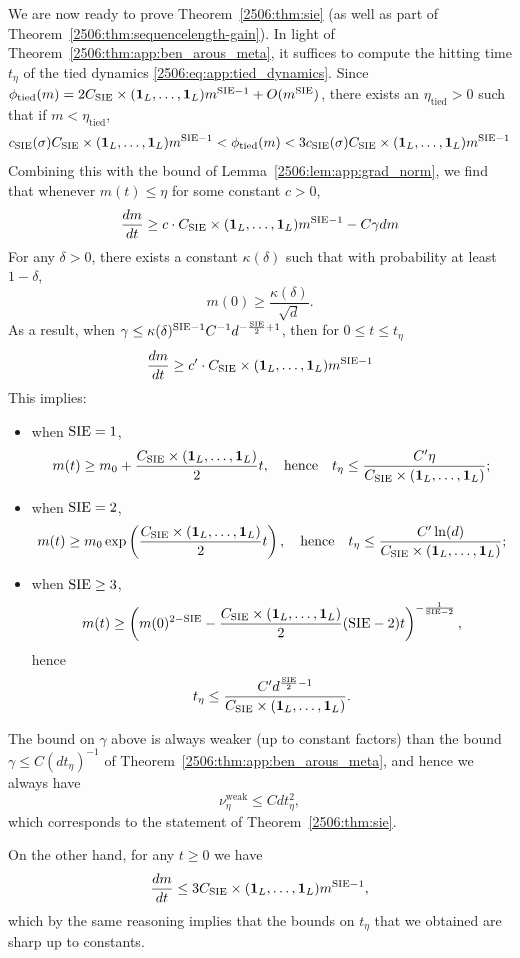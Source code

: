 We are now ready to prove Theorem~\ref{2506:thm:sie} (as well as part of Theorem~\ref{2506:thm:sequencelength-gain}). In light of Theorem~\ref{2506:thm:app:ben_arous_meta}, it suffices to compute the hitting time $t_\eta$ of the tied dynamics \eqref{2506:eq:app:tied_dynamics}.
Since $\phi_{\text{tied}}(m) = 2 C_{\mathrm{SIE}} \times (\mathbf{1}_L, \dots, \mathbf{1}_L) m^{\mathrm{SIE}-1} + O(m^{\mathrm{SIE}})$, there exists an $\eta_{\text{tied}} > 0$ such that if $m < \eta_{\text{tied}}$,
\[ c_{\mathrm{SIE}}(\sigma) C_{\mathrm{SIE}} \times (\mathbf{1}_L, \dots, \mathbf{1}_L) m^{\mathrm{SIE}-1} < \phi_{\text{tied}}(m) < 3c_{\mathrm{SIE}}(\sigma) C_{\mathrm{SIE}} \times (\mathbf{1}_L, \dots, \mathbf{1}_L) m^{\mathrm{SIE}-1} \]
Combining this with the bound of Lemma~\ref{2506:lem:app:grad_norm}, we find that whenever $m(t) \leq \eta$ for some constant $c > 0$,
\[ \frac{dm}{dt} \geq c \cdot C_{\mathrm{SIE}} \times (\mathbf{1}_L, \dots, \mathbf{1}_L) m^{\mathrm{SIE}-1} - C\gamma dm \]
For any $\delta > 0$, there exists a constant $\kappa(\delta)$ such that with  probability at least $1 - \delta$,
\[ m(0) \geq \frac{\kappa(\delta)}{\sqrt{d}}. \]
As a result, when $\gamma \leq \kappa(\delta)^{\mathrm{SIE}-1} C^{-1}d^{-\frac{\mathrm{SIE}}{2}+1}$, then for $0 \leq t \leq t_\eta$
\[ \frac{dm}{dt} \geq c' \cdot C_{\mathrm{SIE}} \times (\mathbf{1}_L, \dots, \mathbf{1}_L) m^{\mathrm{SIE}-1} \]
This implies:
\begin{itemize}
    \item when $\mathrm{SIE} = 1$,
    \[ m(t) \geq m_0 + \frac{C_{\mathrm{SIE}} \times (\mathbf{1}_L, \dots, \mathbf{1}_L)}{2}t, \quad \text{hence} \quad t_\eta \leq \frac{C'\eta}{C_{\mathrm{SIE}} \times (\mathbf{1}_L, \dots, \mathbf{1}_L)}; \]
    \item when $\mathrm{SIE} = 2$,
    \[ m(t) \geq m_0\exp\left(\frac{C_{\mathrm{SIE}} \times (\mathbf{1}_L, \dots, \mathbf{1}_L)}{2}t\right), \quad \text{hence} \quad t_\eta \leq \frac{C'\ln(d)}{C_{\mathrm{SIE}} \times (\mathbf{1}_L, \dots, \mathbf{1}_L)}; \]
    \item when $\mathrm{SIE} \geq 3$,
    \[ m(t) \geq \left(m(0)^{2-\mathrm{SIE}} - \frac{C_{\mathrm{SIE}} \times (\mathbf{1}_L, \dots, \mathbf{1}_L)}{2}(\mathrm{SIE}-2)t\right)^{-\frac1{\mathrm{SIE}-2}},\] hence\[t_\eta \leq \frac{C'd^{\frac{\mathrm{SIE}}2-1}}{C_{\mathrm{SIE}} \times (\mathbf{1}_L, \dots, \mathbf{1}_L)}. \]
\end{itemize}
The bound on $\gamma$ above is always weaker (up to constant factors) than the bound $\gamma \leq C(dt_\eta)^{-1}$ of Theorem~\ref{2506:thm:app:ben_arous_meta}, and hence we always have
\[ \nu^\mathrm{weak}_\eta \leq Cdt_\eta^2,\]
which corresponds to the statement of Theorem~\ref{2506:thm:sie}.

On the other hand, for any $t \geq 0$ we have
\[ \frac{dm}{dt} \leq  3C_{\mathrm{SIE}} \times (\mathbf{1}_L, \dots, \mathbf{1}_L) m^{\mathrm{SIE}-1}, \]
which by the same reasoning implies that the bounds on $t_\eta$ that we obtained are sharp up to constants.

